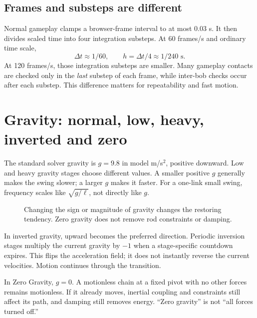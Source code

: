 \documentclass[11pt,a4paper]{article}
\begin{document}
\subsection{Frames and substeps are different}
Normal gameplay clamps a browser-frame interval to at most \(0.03\) s. It then divides scaled time into four integration substeps. At 60 frames/s and ordinary time scale,
\[
 \Delta t\approx1/60,\qquad h=\Delta t/4\approx1/240\text{ s}.
\]
At 120 frames/s, those integration substeps are smaller. Many gameplay contacts are checked only in the \emph{last} substep of each frame, while inter-bob checks occur after each substep. This difference matters for repeatability and fast motion.

\section{Gravity: normal, low, heavy, inverted and zero}
The standard solver gravity is \(g=9.8\) in model m/s\(^2\), positive downward. Low and heavy gravity stages choose different values. A smaller positive \(g\) generally makes the swing slower; a larger \(g\) makes it faster. For a one-link small swing, frequency scales like \(\sqrt{g/\ell}\), not directly like \(g\).
\begin{figure}[H]\centering
{}\caption{Changing the sign or magnitude of gravity changes the restoring tendency. Zero gravity does not remove rod constraints or damping.}
\end{figure}
In inverted gravity, upward becomes the preferred direction. Periodic inversion stages multiply the current gravity by \(-1\) when a stage-specific countdown expires. This flips the acceleration field; it does not instantly reverse the current velocities. Motion continues through the transition.

In Zero Gravity, \(g=0\). A motionless chain at a fixed pivot with no other forces remains motionless. If it already moves, inertial coupling and constraints still affect its path, and damping still removes energy. ``Zero gravity'' is not ``all forces turned off.''
\end{document}
